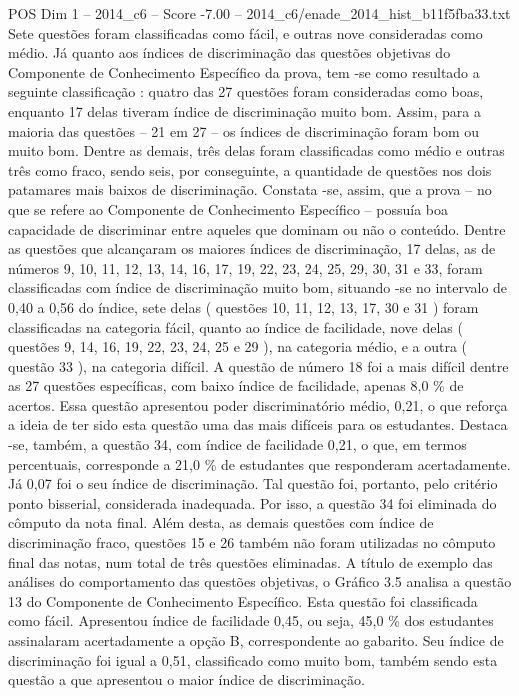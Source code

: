 \begin{textsample}{POS Dim 1 – 2014\_c6 – Score -7.00 – 2014\_c6/enade\_2014\_hist\_b11f5fba33.txt}
Sete questões foram classificadas como fácil, e outras nove consideradas como médio.
Já quanto aos índices de discriminação das questões objetivas do Componente de Conhecimento Específico da prova, tem -se como resultado a seguinte classificação : quatro das 27 questões foram consideradas como boas, enquanto 17 delas tiveram índice de discriminação muito bom.
Assim, para a maioria das questões – 21 em 27 – os índices de discriminação foram bom ou muito bom.
Dentre as demais, três delas foram classificadas como médio e outras três como fraco, sendo seis, por conseguinte, a quantidade de questões nos dois patamares mais baixos de discriminação.
Constata -se, assim, que a prova – no que se refere ao Componente de Conhecimento Específico – possuía boa capacidade de discriminar entre aqueles que dominam ou não o conteúdo.
Dentre as questões que alcançaram os maiores índices de discriminação, 17 delas, as de números 9, 10, 11, 12, 13, 14, 16, 17, 19, 22, 23, 24, 25, 29, 30, 31 e 33, foram classificadas com índice de discriminação muito bom, situando -se no intervalo de 0,40 a 0,56 do índice, sete delas ( questões 10, 11, 12, 13, 17, 30 e 31 ) foram classificadas na categoria fácil, quanto ao índice de facilidade, nove delas ( questões 9, 14, 16, 19, 22, 23, 24, 25 e 29 ), na categoria médio, e a outra ( questão 33 ), na categoria difícil.
A questão de número 18 foi a mais difícil dentre as 27 questões específicas, com baixo índice de facilidade, apenas 8,0 \% de acertos.
Essa questão apresentou poder discriminatório médio, 0,21, o que reforça a ideia de ter sido esta questão uma das mais difíceis para os estudantes.
Destaca -se, também, a questão 34, com índice de facilidade 0,21, o que, em termos percentuais, corresponde a 21,0 \% de estudantes que responderam acertadamente.
Já 0,07 foi o seu índice de discriminação.
Tal questão foi, portanto, pelo critério ponto bisserial, considerada inadequada.
Por isso, a questão 34 foi eliminada do cômputo da nota final.
Além desta, as demais questões com índice de discriminação fraco, questões 15 e 26 também não foram utilizadas no cômputo final das notas, num total de três questões eliminadas.
A título de exemplo das análises do comportamento das questões objetivas, o Gráfico 3.5 analisa a questão 13 do Componente de Conhecimento Específico.
Esta questão foi classificada como fácil.
Apresentou índice de facilidade 0,45, ou seja, 45,0 \% dos estudantes assinalaram acertadamente a opção B, correspondente ao gabarito.
Seu índice de discriminação foi igual a 0,51, classificado como muito bom, também sendo esta questão a que apresentou o maior índice de discriminação.

\end{textsample}

